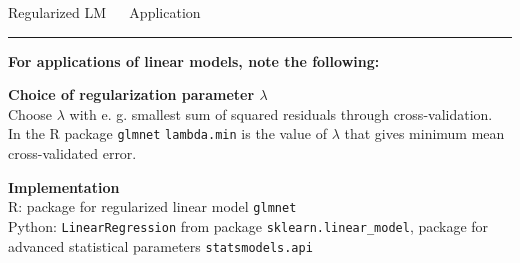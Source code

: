 \documentclass[11pt,compress,t,notes=noshow, xcolor=table]{beamer}
\begin{document}

\LARGE
\begin{frame}{\textcolor{gray!80}{Regularized LM} ~~ Application}
\normalsize
\vspace{-0.5cm}
\noindent \textcolor{gray!80}{\rule{\textwidth}{1pt}}

\vspace{0.3cm}

\footnotesize

\textbf{For applications of linear models, note the following:}

\lz

  \textbf{\textcolor{gray!80}{Choice of regularization parameter  $\lambda$}} \\
  \smallskip
 Choose $\lambda$ with e. g. smallest sum of squared residuals through cross-validation. \\
 In the R package \texttt{glmnet} \texttt{lambda.min} is the value of $\lambda$ that gives minimum mean cross-validated error.
 
 

\lz

  \textbf{\textcolor{gray!80}{Implementation}} \\
  \smallskip
  R: package for regularized linear model \texttt{glmnet}\\
  Python: \texttt{LinearRegression} from package \texttt{sklearn.linear\_model}, package for advanced statistical parameters \texttt{statsmodels.api}

\end{frame}





% 
\end{document}
